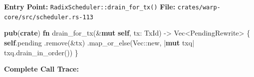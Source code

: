 \documentclass[11pt]{book}
\newenvironment{Shaded}{}{}
\newcommand{\DataTypeTok}[1]{\textcolor[rgb]{0.56,0.13,0.00}{#1}}
\newcommand{\KeywordTok}[1]{\textcolor[rgb]{0.00,0.44,0.13}{\textbf{#1}}}
\newcommand{\NormalTok}[1]{#1}
\newcommand{\OperatorTok}[1]{\textcolor[rgb]{0.40,0.40,0.40}{#1}}
\newcommand{\PreprocessorTok}[1]{\textcolor[rgb]{0.74,0.48,0.00}{#1}}
\begin{document}
\textbf{Entry Point:} \texttt{RadixScheduler::drain\_for\_tx()}
\textbf{File:} \texttt{crates/warp-core/src/scheduler.rs-113}

\begin{Shaded}
\begin{Highlighting}[]
\KeywordTok{pub}\NormalTok{(}\KeywordTok{crate}\NormalTok{) }\KeywordTok{fn}\NormalTok{ drain\_for\_tx(}\OperatorTok{\&}\KeywordTok{mut} \KeywordTok{self}\OperatorTok{,}\NormalTok{ tx}\OperatorTok{:}\NormalTok{ TxId) }\OperatorTok{{-}\textgreater{}} \DataTypeTok{Vec}\OperatorTok{\textless{}}\NormalTok{PendingRewrite}\OperatorTok{\textgreater{}} \OperatorTok{\{}
    \KeywordTok{self}\OperatorTok{.}\NormalTok{pending}
        \OperatorTok{.}\NormalTok{remove(}\OperatorTok{\&}\NormalTok{tx)}
        \OperatorTok{.}\NormalTok{map\_or\_else(}\DataTypeTok{Vec}\PreprocessorTok{::}\NormalTok{new}\OperatorTok{,} \OperatorTok{|}\KeywordTok{mut}\NormalTok{ txq}\OperatorTok{|}\NormalTok{ txq}\OperatorTok{.}\NormalTok{drain\_in\_order())}
\OperatorTok{\}}
\end{Highlighting}
\end{Shaded}

\textbf{Complete Call Trace:}
\end{document}
